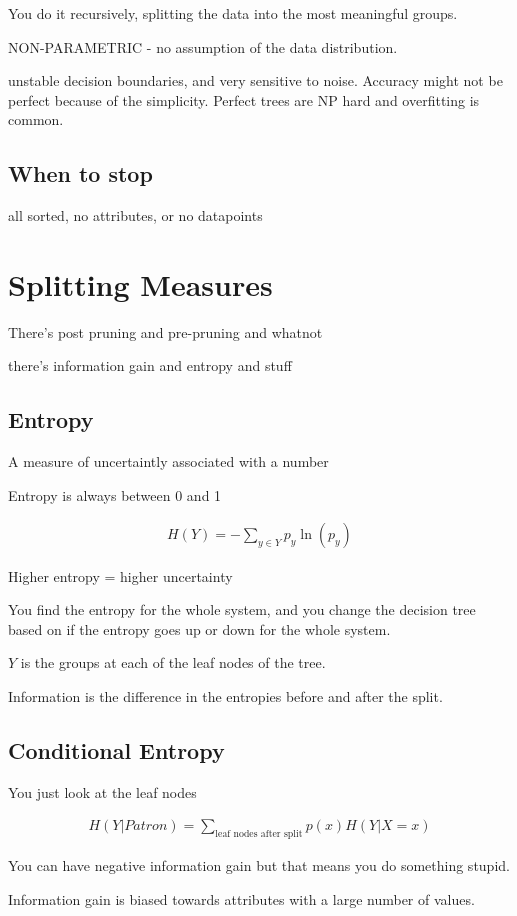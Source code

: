 \documentclass[fleqn]{report}
\newcommand{\equations} [1] {
\begin{gather*}
#1
\end{gather*}
}
\begin{document}
You do it recursively, splitting the data into the most meaningful 
groups.

NON-PARAMETRIC - no assumption of the data distribution.

unstable decision boundaries, and very sensitive to noise.
Accuracy might not be perfect because of the simplicity. 
Perfect trees are NP hard and overfitting is common. 
\subsection{When to stop}
all sorted, no attributes, or no datapoints

\section{Splitting Measures}

There's post pruning and pre-pruning and whatnot 

there's information gain and entropy and stuff

\subsection{Entropy}
A measure of uncertaintly associated with a number 

Entropy is always between 0 and 1

\equations{
    H(Y)
    =
    -
    \sum_{y \in Y}
    p_y \ln(p_y)
}
Higher entropy = higher uncertainty 

You find the entropy for the whole system, and you 
change the decision tree based on if the entropy goes up or down 
for the whole system. 

$Y$ is the groups at each of the leaf nodes of the tree. 

Information is the difference in the entropies before and after the split. 

\subsection{Conditional Entropy}
You just look at the leaf nodes 

\equations{
    H(Y|Patron)
    =
    \sum_{\textrm{leaf nodes after split}}
    p(x)
    H(Y|X = x)
}

You can have negative information gain but that means 
you do something stupid.

Information gain is biased towards attributes with a large number of values.
\end{document}
